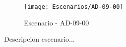 \begin{figure}[H]
\centering
\texttt{[image: Escenarios/AD-09-00]}
\caption{Escenario - AD-09-00}
\label{fig:AD-09-00}
\end{figure}

Descripcion escenario...
\clearpage
